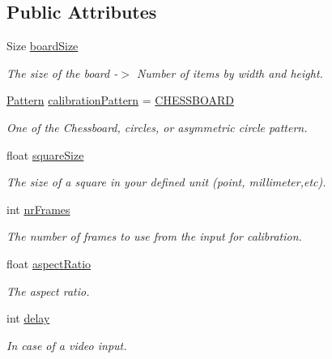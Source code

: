 \subsection*{Public Attributes}
\begin{DoxyCompactItemize}
\item 
Size \mbox{\hyperlink{class_settings_a5030a7164df923bb3b86dd7a0fc9af30}{board\+Size}}
\begin{DoxyCompactList}\small\item\em The size of the board -\/$>$ Number of items by width and height. \end{DoxyCompactList}\item 
\mbox{\hyperlink{class_settings_a0e7117abd9427a6f8bc1d1d8d456b5c8}{Pattern}} \mbox{\hyperlink{class_settings_a94551b7ffe8ac60311b035b2905e9498}{calibration\+Pattern}} = \mbox{\hyperlink{class_settings_a0e7117abd9427a6f8bc1d1d8d456b5c8ae96aa2d60b4a554a215524a05b32908e}{C\+H\+E\+S\+S\+B\+O\+A\+RD}}
\begin{DoxyCompactList}\small\item\em One of the Chessboard, circles, or asymmetric circle pattern. \end{DoxyCompactList}\item 
float \mbox{\hyperlink{class_settings_a6c94708776ad1ce258fc44f2101f5941}{square\+Size}}
\begin{DoxyCompactList}\small\item\em The size of a square in your defined unit (point, millimeter,etc). \end{DoxyCompactList}\item 
int \mbox{\hyperlink{class_settings_a7e6654cd0e51791ed687eaa85f8fc143}{nr\+Frames}}
\begin{DoxyCompactList}\small\item\em The number of frames to use from the input for calibration. \end{DoxyCompactList}\item 
float \mbox{\hyperlink{class_settings_af55c910308a0d773055d0b19261bb3b8}{aspect\+Ratio}}
\begin{DoxyCompactList}\small\item\em The aspect ratio. \end{DoxyCompactList}\item 
int \mbox{\hyperlink{class_settings_a5fe947366441009187d633f9e4663256}{delay}}
\begin{DoxyCompactList}\small\item\em In case of a video input. \end{DoxyCompactList}\item 

\end{DoxyCompactItemize}

